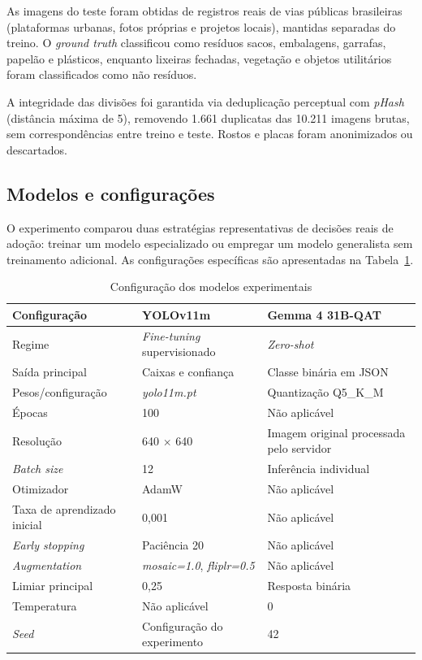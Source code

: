 \documentclass[kdmile,a4paper]{kdmile}
\begin{document}
As imagens do teste foram obtidas de registros reais de vias públicas brasileiras (plataformas urbanas, fotos próprias e projetos locais), mantidas separadas do treino. O \emph{ground truth} classificou como resíduos sacos, embalagens, garrafas, papelão e plásticos, enquanto lixeiras fechadas, vegetação e objetos utilitários foram classificados como não resíduos.

A integridade das divisões foi garantida via deduplicação perceptual com \emph{pHash} (distância máxima de 5), removendo 1.661 duplicatas das 10.211 imagens brutas, sem correspondências entre treino e teste. Rostos e placas foram anonimizados ou descartados.

\subsection{Modelos e configurações}
\label{sec:modelos-configuracoes}

O experimento comparou duas estratégias representativas de decisões reais de adoção: treinar um modelo especializado ou empregar um modelo generalista sem treinamento adicional. As configurações específicas são apresentadas na Tabela~\ref{tab:configuracao}.

\begin{table}[htbp]
\centering
\footnotesize
\caption{Configuração dos modelos experimentais}
\label{tab:configuracao}
\begin{tabular}{lp{4.2cm}p{5.2cm}}
\toprule
\textbf{Configuração} & \textbf{YOLOv11m} & \textbf{Gemma 4 31B-QAT} \\
\midrule
Regime & \emph{Fine-tuning} supervisionado & \emph{Zero-shot} \\
Saída principal & Caixas e confiança & Classe binária em JSON \\
Pesos/configuração & \emph{yolo11m.pt} & Quantização Q5\_K\_M \\
Épocas & 100 & Não aplicável \\
Resolução & 640 $\times$ 640 & Imagem original processada pelo servidor \\
\emph{Batch size} & 12 & Inferência individual \\
Otimizador & AdamW & Não aplicável \\
Taxa de aprendizado inicial & 0,001 & Não aplicável \\
\emph{Early stopping} & Paciência 20 & Não aplicável \\
\emph{Augmentation} & \emph{mosaic=1.0}, \emph{fliplr=0.5} & Não aplicável \\
Limiar principal & 0,25 & Resposta binária \\
Temperatura & Não aplicável & 0 \\
\emph{Seed} & Configuração do experimento & 42 \\
\bottomrule
\end{tabular}
\end{table}
\end{document}
